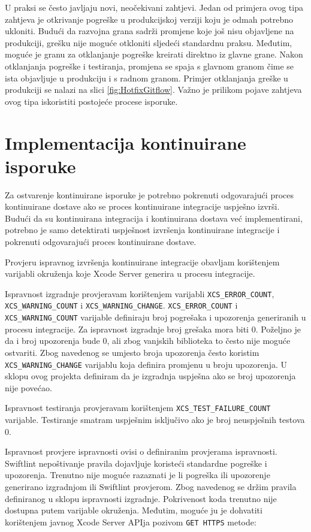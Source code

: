 \documentclass[times, utf8, diplomski, numeric]{fer}
\begin{document}
U praksi se često javljaju novi, neočekivani zahtjevi. Jedan od primjera ovog tipa zahtjeva je otkrivanje pogreške u produkcijskoj verziji koju je odmah potrebno ukloniti. Budući da razvojna grana sadrži promjene koje još nisu objavljene na produkciji, grešku nije moguće otkloniti sljedeći standardnu praksu. Međutim, moguće je granu za otklanjanje pogreške kreirati direktno iz glavne grane. Nakon otklanjanja pogreške i testiranja, promjena se spaja s glavnom granom čime se ista objavljuje u produkciju i s radnom granom. Primjer otklanjanja greške u produkciji se nalazi na slici \ref{fig:HotfixGitflow}. Važno je prilikom pojave zahtjeva ovog tipa iskoristiti postojeće procese isporuke.


\section{Implementacija kontinuirane isporuke}

Za ostvarenje kontinuirane isporuke je potrebno pokrenuti odgovarajući proces kontinuirane dostave ako se proces kontinuirane integracije uspješno izvrši. Budući da su kontinuirana integracija i kontinuirana dostava već implementirani, potrebno je samo detektirati uspješnost izvršenja kontinuirane integracije i pokrenuti odgovarajući proces kontinuirane dostave.

Provjeru ispravnog izvršenja kontinuirane integracije obavljam korištenjem varijabli okruženja koje Xcode Server generira u procesu integracije.

Ispravnost izgradnje provjeravam korištenjem varijabli \verb|XCS_ERROR_COUNT|, \\ \verb|XCS_WARNING_COUNT| i \verb|XCS_WARNING_CHANGE|. \verb|XCS_ERROR_COUNT| i \\ \verb|XCS_WARNING_COUNT| varijable definiraju broj pogrešaka i upozorenja generiranih u procesu integracije. Za ispravnost izgradnje broj grešaka mora biti 0. Poželjno je da i broj upozorenja bude 0, ali zbog vanjskih biblioteka to često nije moguće ostvariti. Zbog navedenog se umjesto broja upozorenja često koristim \verb|XCS_WARNING_CHANGE| varijablu koja definira promjenu u broju upozorenja. U sklopu ovog projekta definiram da je izgradnja uspješna ako se broj upozorenja nije povećao.

Ispravnost testiranja provjeravam korištenjem \verb|XCS_TEST_FAILURE_COUNT| varijable. Testiranje smatram uspješnim isključivo ako je broj neuspješnih testova 0.

Ispravnost provjere ispravnosti ovisi o definiranim provjerama ispravnosti. Swiftlint nepoštivanje pravila dojavljuje koristeći standardne pogreške i upozorenja. Trenutno nije moguće razaznati je li pogreška ili upozorenje generirano izgradnjom ili Swiftlint provjerom. Zbog navedenog se držim pravila definiranog u sklopu ispravnosti izgradnje. Pokrivenost koda trenutno nije dostupna putem varijable okruženja. Međutim, moguće ju je dohvatiti korištenjem javnog Xcode Server APIja pozivom \verb|GET HTTPS| metode:
\end{document}
